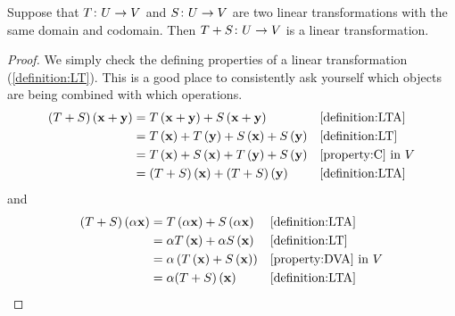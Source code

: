 \documentclass{ximera}
\begin{document}
\begin{theorem}
\label{theorem:SLTLT}

Suppose that $T\colon U\rightarrow V$ and $S\colon U\rightarrow V$ are two linear
transformations with the same domain and codomain.  Then
$T+S\colon U\rightarrow V$ is a linear transformation.


\begin{proof}
We simply check the defining properties of a linear transformation (\ref{definition:LT}).  This is a good place to consistently ask yourself which objects are being combined with which operations.
\begin{align*}
(T+S)\left(\mathbf{x}+\mathbf{y}\right)&=
T\left(\mathbf{x}+\mathbf{y}\right)+S\left(\mathbf{x}+\mathbf{y}\right)&&\ref{definition:LTA}\\
&=T\left(\mathbf{x}\right)+T\left(\mathbf{y}\right)+S\left(\mathbf{x}\right)+S\left(\mathbf{y}\right)&&\ref{definition:LT}\\
&=T\left(\mathbf{x}\right)+S\left(\mathbf{x}\right)+T\left(\mathbf{y}\right)+S\left(\mathbf{y}\right)&&\ref{property:C}\text{ in }V\\
&=(T+S)\left(\mathbf{x}\right)+(T+S)\left(\mathbf{y}\right)&&\ref{definition:LTA}\\
\end{align*}
and
\begin{align*}
(T+S)\left(\alpha\mathbf{x}\right)&=
T\left(\alpha\mathbf{x}\right)+S\left(\alpha\mathbf{x}\right)&&\ref{definition:LTA}\\
&=\alpha T\left(\mathbf{x}\right)+\alpha S\left(\mathbf{x}\right)&&\ref{definition:LT}\\
&=\alpha\left(T\left(\mathbf{x}\right)+S\left(\mathbf{x}\right)\right)&&\ref{property:DVA}\text{ in }V\\
&=\alpha(T+S)\left(\mathbf{x}\right)&&\ref{definition:LTA}\\
\end{align*}




\end{proof}
\end{theorem}
\end{document}
